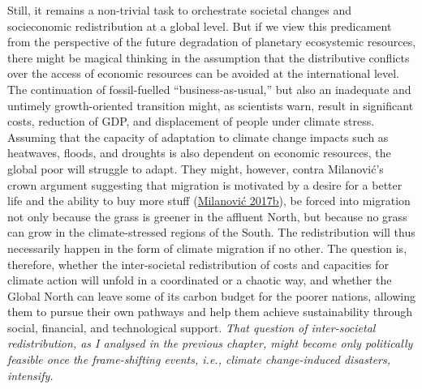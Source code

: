 \documentclass[a4paper, nobind]{templates/ociamthesis}
\begin{document}
Still, it remains a non-trivial task to orchestrate societal changes and socieconomic redistribution at a global level. But if we view this predicament from the perspective of the future degradation of planetary ecosystemic resources, there might be magical thinking in the assumption that the distributive conflicts over the access of economic resources can be avoided at the international level. The continuation of fossil-fuelled ``business-as-usual,'' but also an inadequate and untimely growth-oriented transition might, as scientists warn, result in significant costs, reduction of GDP, and displacement of people under climate stress. Assuming that the capacity of adaptation to climate change impacts such as heatwaves, floods, and droughts is also dependent on economic resources, the global poor will struggle to adapt. They might, however, contra Milanović's crown argument suggesting that migration is motivated by a desire for a better life and the ability to buy more stuff (\protect\hyperlink{ref-milanovic_illusion_2017}{Milanović 2017b}), be forced into migration not only because the grass is greener in the affluent North, but because no grass can grow in the climate-stressed regions of the South. The redistribution will thus necessarily happen in the form of climate migration if no other. The question is, therefore, whether the inter-societal redistribution of costs and capacities for climate action will unfold in a coordinated or a chaotic way, and whether the Global North can leave some of its carbon budget for the poorer nations, allowing them to pursue their own pathways and help them achieve sustainability through social, financial, and technological support. \emph{That question of inter-societal redistribution, as I analysed in the previous chapter, might become only politically feasible once the frame-shifting events, i.e., climate change-induced disasters, intensify.}
\end{document}
